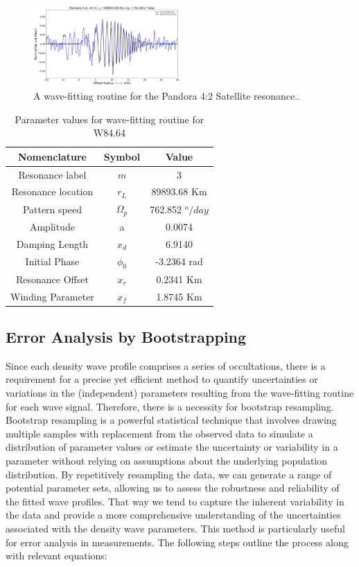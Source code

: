 \documentclass[conference]{IEEEtran}
\begin{document}
\begin{figure}[h]
\centering
\includegraphics[width=0.5\textwidth]{pandora_42_wavefit.png}
\caption{A wave-fitting routine for the Pandora 4:2 Satellite resonance..} \label{fig:my_label}
\end{figure}


\begin{table}
\centering
\begin{tabular}{|c|c|c|}
\hline
\textbf{Nomenclature} & \textbf{Symbol} & \textbf{Value} \\
\hline
Resonance label & $m$ & 3 \\
\hline
Resonance location & $r_{L}$ & 89893.68 Km \\
\hline
Pattern speed & $\Omega_{p}$ & 762.852 $^{o}/day$ \\
\hline
Amplitude & a & 0.0074 \\
\hline
Damping Length & $x_{d}$ & 6.9140 \\
\hline
Initial Phase & $\phi_{0}$ & -3.2364 rad \\
\hline
Resonance Offset & $x_{r}$ & 0.2341 Km \\
\hline
Winding Parameter & $x_{f}$ & 1.8745 Km \\
\hline
\end{tabular}
\caption{Parameter values for wave-fitting routine for W84.64}
\end{table}

\subsection{Error Analysis by Bootstrapping}
Since each density wave profile comprises a series of occultations, there is a requirement for a precise yet efficient method to quantify uncertainties or variations in the (independent) parameters resulting from the wave-fitting routine for each wave signal. Therefore, there is a necessity for bootstrap resampling.
Bootstrap resampling is a powerful statistical technique that involves drawing multiple samples with replacement from the observed data to simulate a distribution of parameter values or estimate the uncertainty or variability in a parameter without relying on assumptions about the underlying population distribution\cite{Chernick2007BootstrapMA}\cite{davison_hinkley_1997}. By repetitively resampling the data, we can generate a range of potential parameter sets, allowing us to assess the robustness and reliability of the fitted wave profiles. That way we tend to capture the inherent variability in the data and provide a more comprehensive understanding of the uncertainties associated with the density wave parameters\cite{Efron1994AnIT}\cite{article}. This method is particularly useful for error analysis in measurements. The following steps outline the process along with relevant equations:
\end{document}

